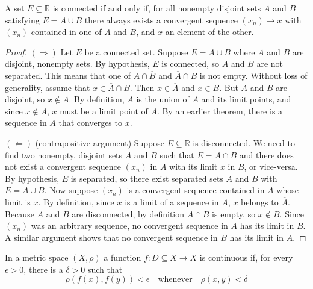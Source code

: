 \par\vspace{1 cm}
\begin{theorem*} A set $E\subseteq\mathbb{R}$ is connected if and only if, for all nonempty disjoint sets $A$ and $B$ satisfying $E=A\cup B$ there always exists a convergent sequence $(x_n)\rightarrow x$ with $(x_n)$ contained in one of $A$ and $B$, and $x$ an element of the other.
\end{theorem*}
\begin{proof}
$(\Rightarrow)$ Let $E$ be a connected set. Suppose $E=A\cup B$ where $A$ and $B$ are disjoint, nonempty sets.  By hypothesis, $E$ is connected, so $A$ and $B$ are not separated. This means that one of $A\cap\overline{B}$ and $\overline{A}\cap B$ is not empty.  Without loss of generality, assume that $x\in\overline{A}\cap B$.  Then $x\in\overline{A}$ and $x\in B$.  But $A$ and $B$ are disjoint, so $x\notin A$.  By definition, $\overline{A}$ is the union of $A$ and its limit points, and since $x\notin A$, $x$ must be a limit point of $A$.  By an earlier theorem, there is a sequence in $A$ that converges to $x$.    
\par\vspace{1 cm}
$(\Leftarrow)$ (contrapositive argument) Suppose $E\subseteq\mathbb{R}$ is disconnected.  We need to find two nonempty, disjoint sets $A$ and $B$ such that $E=A\cap B$ and there does not exist a convergent sequence $(x_n)$ in $A$ with its limit $x$ in $B$, or vice-versa.  By hypothesis, $E$ is separated, so there exist separated sets $A$ and $B$ with $E=A\cup B$. Now suppose $(x_n)$ is a convergent sequence contained in $A$ whose limit is $x$.  By definition, since $x$ is a limit of a sequence in $A$, $x$ belongs to $\overline{A}$. Because $A$ and $B$ are disconnected, by definition $\overline{A}\cap B$ is empty, so $x\notin B$.  Since $(x_n)$ was an arbitrary sequence, no convergent sequence in $A$ has its limit in $B$.  A similar argument shows that no convergent sequence in $B$ has its limit in $A$. 
\end{proof}
\par\vspace{1 cm}
\begin{definition*} In a metric space $(X,\rho)$ a function $f:D\subseteq X\rightarrow X$ is continuous if, for every $\epsilon>0$, there is a $\delta>0$ such that
\[
\rho(f(x),f(y))<\epsilon\quad\mbox{whenever}\quad\rho(x,y)<\delta
\]
\end{definition*}
\par\vspace{1 cm}
